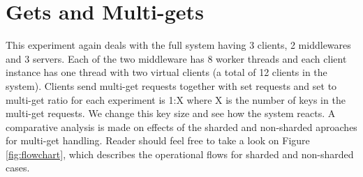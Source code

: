 \documentclass[11pt,a4paper]{article}
\begin{document}
\section{Gets and Multi-gets} \label{sec:gmg}
This experiment again deals with the full system having 3 clients, 2 middlewares and 3 servers. Each of the two middleware has 8 worker threads and each client instance has one thread with two virtual clients (a total of 12 clients in the system). Clients send multi-get requests together with set requests and set to multi-get ratio for each experiment is 1:X where X is the number of keys in the multi-get requests. We change this key size and see how the system reacts. A comparative analysis is made on effects of the sharded and non-sharded aproaches for multi-get handling. Reader should feel free to take a look on Figure \ref{fig:flowchart}, which describes the operational flows for sharded and non-sharded cases.
\end{document}
